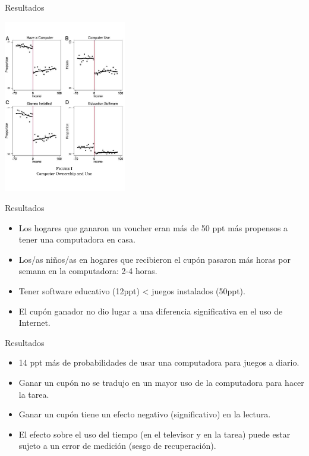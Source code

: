 \documentclass[11pt, aspectratio=169, compress]{beamer}
\begin{document}
\begin{frame}[t]{Resultados}
	\vspace*{-2em}
	\begin{center}
		\includegraphics[width=0.4\textwidth]{fig1}
	\end{center}
\end{frame}
\begin{frame}[t]{Resultados}
	\begin{itemize}
	\item Los hogares que ganaron un voucher eran más de 50 ppt más propensos a tener una computadora en casa.
	\item Los/as niños/as en hogares que recibieron el cupón pasaron más horas por semana en la computadora: 2-4 horas. 
	\item Tener software educativo (12ppt) < juegos instalados (50ppt). 
	\item El cupón ganador no dio lugar a una diferencia significativa en el uso de Internet. 
	\end{itemize}
\end{frame}
\begin{frame}[t]{Resultados}
	\begin{itemize}
	\item 14 ppt más de probabilidades de usar una computadora para juegos a diario.
	\item Ganar un cupón no se tradujo en un mayor uso de la computadora para hacer la tarea.
	\item Ganar un cupón tiene un efecto negativo (significativo) en la lectura.
	\item El efecto sobre el uso del tiempo (en el televisor y en la tarea) puede estar sujeto a un error de medición (sesgo de recuperación).
	\end{itemize}
\end{frame}
\end{document}
